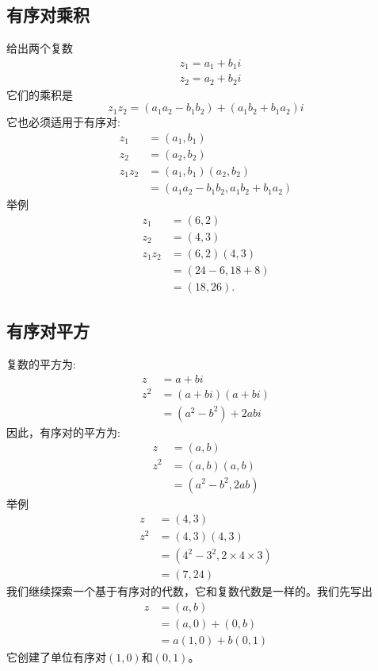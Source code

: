 \subsection{有序对乘积}
给出两个复数
$$
  \begin{aligned}
     & z_{1}=a_{1}+b_{1} i \\
     & z_{2}=a_{2}+b_{2} i
  \end{aligned}
$$
它们的乘积是
$$
  z_{1} z_{2}=\left(a_{1} a_{2}-b_{1} b_{2}\right)+\left(a_{1} b_{2}+b_{1} a_{2}\right) i
$$
它也必须适用于有序对:
$$
  \begin{aligned}
    z_{1}       & =\left(a_{1}, b_{1}\right)                                     \\
    z_{2}       & =\left(a_{2}, b_{2}\right)                                     \\
    z_{1} z_{2} & =\left(a_{1}, b_{1}\right)\left(a_{2}, b_{2}\right)            \\
                & =\left(a_{1} a_{2}-b_{1} b_{2}, a_{1} b_{2}+b_{1} a_{2}\right)
  \end{aligned}
$$
举例
$$
  \begin{aligned}
    z_{1}       & =(6,2)       \\
    z_{2}       & =(4,3)       \\
    z_{1} z_{2} & =(6,2)(4,3)  \\
                & =(24-6,18+8) \\
                & =(18,26) .
  \end{aligned}
$$

\subsection{有序对平方}
复数的平方为:
$$
  \begin{aligned}
    z     & =a+b i                            \\
    z^{2} & =(a+b i)(a+b i)                   \\
          & =\left(a^{2}-b^{2}\right)+2 a b i
  \end{aligned}
$$
因此，有序对的平方为:
$$
  \begin{aligned}
    z     & =(a, b)                          \\
    z^{2} & =(a, b)(a, b)                    \\
          & =\left(a^{2}-b^{2}, 2 a b\right)
  \end{aligned}
$$
举例
$$
  \begin{aligned}
    z     & =(4,3)                                         \\
    z^{2} & =(4,3)(4,3)                                    \\
          & =\left(4^{2}-3^{2}, 2 \times 4 \times 3\right) \\
          & =(7,24)
  \end{aligned}
$$
我们继续探索一个基于有序对的代数，它和复数代数是一样的。我们先写出
$$
  \begin{aligned}
    z & =(a, b)        \\
      & =(a, 0)+(0, b) \\
      & =a(1,0)+b(0,1)
  \end{aligned}
$$
它创建了单位有序对$(1,0)$和$(0,1)$。


